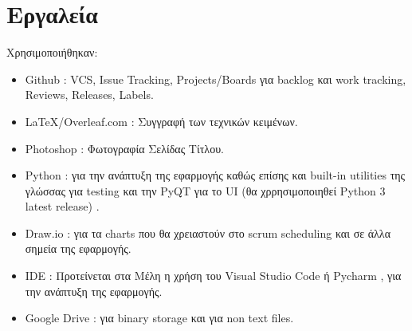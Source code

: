 \documentclass{article}
\begin{document}
\section{Εργαλεία}
Χρησιμοποιήθηκαν:
\begin{itemize}
    \item Github : VCS, Issue Tracking, Projects/Boards για backlog και work tracking, Reviews, Releases, Labels.
    \item \LaTeX/Overleaf.com : Συγγραφή των τεχνικών κειμένων.
    \item Photoshop : Φωτογραφία Σελίδας Τίτλου.
    \item Python : για την ανάπτυξη της εφαρμογής καθώς επίσης και built-in utilities της γλώσσας για testing και την PyQT για το UI (θα χρρησιμοποιηθεί Python 3 latest release) .
    \item Draw.io : για τα charts που θα χρειαστούν στο scrum scheduling και σε άλλα σημεία της εφαρμογής.
    \item IDE : Προτείνεται στα Mέλη η χρήση του Visual Studio Code ή Pycharm , για την ανάπτυξη της εφαρμογής.
    \item Google Drive : για binary storage και για non text files.
\end{itemize}
\end{document}
